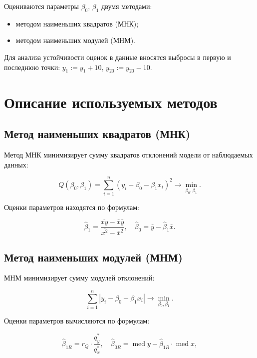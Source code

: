 \documentclass[a4paper]{article}
\begin{document}
    Оцениваются параметры $\beta_0$, $\beta_1$ двумя методами:
    \begin{itemize}
        \item методом наименьших квадратов (МНК);
        \item методом наименьших модулей (МНМ).
    \end{itemize}

    Для анализа устойчивости оценок в данные вносятся выбросы в первую и последнюю точки: $y_1 := y_1 + 10$, $y_{20} := y_{20} - 10$.


    \section{Описание используемых методов}

    \subsection{Метод наименьших квадратов (МНК)}

    Метод МНК минимизирует сумму квадратов отклонений модели от наблюдаемых данных:

    \begin{equation}
        Q(\beta_0, \beta_1) = \sum_{i=1}^n (y_i - \beta_0 - \beta_1 x_i)^2 \rightarrow \min_{\beta_0, \beta_1}.
    \end{equation}

    Оценки параметров находятся по формулам:

    \begin{equation}
        \hat{\beta}_1 = \frac{\overline{xy} - \bar{x}\bar{y}}{\overline{x^2} - \bar{x}^2}, \quad \hat{\beta}_0 = \bar{y} - \hat{\beta}_1 \bar{x}.
    \end{equation}

    \subsection{Метод наименьших модулей (МНМ)}

    МНМ минимизирует сумму модулей отклонений:

    \begin{equation}
        \sum_{i=1}^{n}|y_i - \beta_0 - \beta_1 x_i| \rightarrow \min_{\beta_0, \beta_1}.
    \end{equation}

    Оценки параметров вычисляются по формулам:

    \begin{equation}
        \hat{\beta}_{1R} = r_Q \cdot \frac{q_y^*}{q_x^*}, \quad \hat{\beta}_{0R} = \operatorname{med} y - \hat{\beta}_{1R} \cdot \operatorname{med} x,
    \end{equation}
\end{document}
